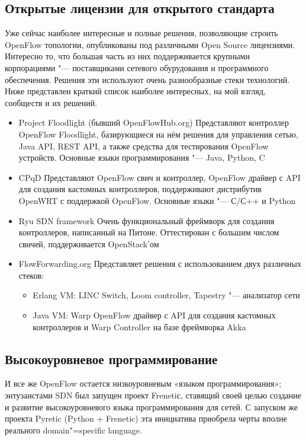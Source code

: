 \documentclass[10pt, a5paper]{article}
\begin{document}
\subsection*{Открытые лицензии для открытого стандарта}

Уже сейчас наиболее интересные и полные решения, позволяющие строить OpenFlow топологии, опубликованы под различными Open Source лицензиями. Интересно то, что большая часть из них поддерживается крупными корпорациями "--- поставщиками сетевого обурудования и программного обеспечения. Решения эти используют очень разнообразные стеки технологий. Ниже представлен краткий список наиболее интересных, на мой взгляд, сообществ и их решений.

\begin{itemize}
  \item Project Floodlight (бывший OpenFlowHub.org)
Представляют контроллер OpenFlow Floodlight, базирующиеся на нём решения для управления сетью, Java API, REST API, а также средства для тестирования OpenFlow устройств. Основные языки программирования "--- Java, Python, C
  \item CPqD
Представляют OpenFlow свич и контроллер, OpenFlow драйвер с API для создания кастомных контроллеров, поддерживают дистрибутив OpenWRT с поддержкой OpenFlow. Основные языки "--- С/С++ и Python
  \item Ryu SDN framework
Очень функциональный фреймворк для создания контроллеров, написанный на Питоне. Оттестирован с большим числом свичей, поддерживается OpenStack'ом
  \item FlowForwarding.org
Представляет решения с использованием двух различных стеков:\begin{itemize}
  \item Erlang VM: LINC Switch, Loom controller, Tapestry "--- анализатор сети
  \item Java VM: Warp OpenFlow драйвер с API для создания кастомных контроллеров и Warp Controller на базе фреймворка Akka
\end{itemize}


\end{itemize}

\subsection*{Высокоуровневое программирование}

И все же OpenFlow остается низкоуровневым «языком программирования»; энтузаистами SDN был запущен проект Frenetiс, ставящий своей целью создание и развитие высокоуровневого языка программирования для сетей. С запуском же проекта Pyretic (Python + Frenetic) эта инициатива приобрела черты вполне реального domain"=specific language.
\end{document}
